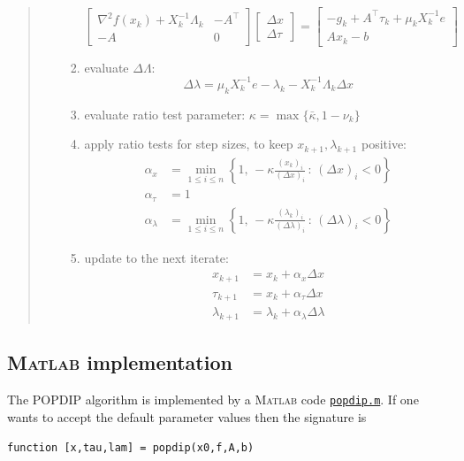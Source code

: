 \documentclass[11pt]{article}
\newcommand{\grad}{\nabla}
\newcommand{\Matlab}{\textsc{Matlab}\xspace}
\begin{document}
\begin{quote}
\begin{itemize}
\begin{enumerate}
    $$\begin{bmatrix}
\grad^2 f(x_k) + X_k^{-1}\Lambda_k & -A^\top \\
-A             & 0
\end{bmatrix}
\begin{bmatrix}
\Delta x \\
\Delta \tau
\end{bmatrix}
=
\begin{bmatrix}
-g_k + A^\top \tau_k + \mu_k X_k^{-1} e \\
A x_k - b
\end{bmatrix}$$
    \item evaluate $\Delta\Lambda$:
    $$\Delta\lambda = \mu_k X_k^{-1} e - \lambda_k - X_k^{-1} \Lambda_k \Delta x$$
    \item evaluate ratio test parameter: $\kappa = \max\{\bar\kappa,1-\nu_k\}$
    \item apply ratio tests for step sizes, to keep $x_{k+1},\lambda_{k+1}$ positive:
\begin{align*}
\alpha_x &= \min_{1\le i\le n} \left\{1, \,-\kappa \frac{(x_k)_i}{(\Delta x)_i} \,:\, (\Delta x)_i < 0\right\} \\
\alpha_\tau &= 1 \\
\alpha_\lambda &= \min_{1\le i\le n} \left\{1, \,-\kappa \frac{(\lambda_k)_i}{(\Delta \lambda)_i} \,:\, (\Delta \lambda)_i < 0\right\}
\end{align*}
    \item update to the next iterate:
\begin{align*}
x_{k+1} &= x_k + \alpha_x \Delta x \\
\tau_{k+1} &= x_k + \alpha_\tau \Delta x \\
\lambda_{k+1} &= \lambda_k + \alpha_\lambda \Delta \lambda
\end{align*}
    \end{enumerate}
\end{itemize}
\end{quote}


\subsection*{\Matlab implementation}

The POPDIP algorithm is implemented by a \Matlab code \href{https://github.com/bueler/popdip/blob/main/matlab/popdip.m}{\texttt{popdip.m}}.  If one wants to accept the default parameter values then the signature is

\medskip
\centerline{\texttt{function [x,tau,lam] = popdip(x0,f,A,b)}}
\end{document}

